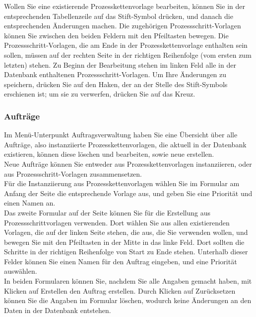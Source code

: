 \documentclass[enabledeprecatedfontcommands,fontsize=12pt,paper=a4,twoside]{scrartcl}
\begin{document}
Wollen Sie eine existierende Prozesskettenvorlage bearbeiten, können Sie in der entsprechenden Tabellenzeile auf das Stift-Symbol drücken, und danach die entsprechenden Änderungen machen. Die zugehörigen Prozessschritt-Vorlagen können Sie zwischen den beiden Feldern mit den Pfeiltasten bewegen. Die Prozessschritt-Vorlagen, die am Ende in der Prozesskettenvorlage enthalten sein sollen, müssen auf der rechten Seite in der richtigen Reihenfolge (vom ersten zum letzten) stehen. Zu Beginn der Bearbeitung stehen im linken Feld alle in der Datenbank enthaltenen Prozessschritt-Vorlagen. Um Ihre Änderungen zu speichern, drücken Sie auf den Haken, der an der Stelle des Stift-Symbols erschienen ist; um sie zu verwerfen, drücken Sie auf das Kreuz. \\

\subsubsection{Aufträge}

Im Menü-Unterpunkt Auftragsverwaltung haben Sie eine Übersicht über alle Aufträge, also instanziierte Prozesskettenvorlagen, die aktuell in der Datenbank existieren, können diese löschen und bearbeiten, sowie neue erstellen. \\

Neue Aufträge können Sie entweder aus Prozesskettenvorlagen instanziieren, oder aus Prozessschritt-Vorlagen zusammensetzen. \\

Für die Instanziierung aus Prozesskettenvorlagen wählen Sie im Formular am Anfang der Seite die entsprechende Vorlage aus, und geben Sie eine Priorität und einen Namen an. \\

Das zweite Formular auf der Seite können Sie für die Erstellung aus Prozessschrittvorlagen verwenden. Dort wählen Sie aus allen existierenden Vorlagen, die auf der linken Seite stehen, die aus, die Sie verwenden wollen, und bewegen Sie mit den Pfeiltasten in der Mitte in das linke Feld. Dort sollten die Schritte in der richtigen Reihenfolge von Start zu Ende stehen. Unterhalb dieser Felder können Sie einen Namen für den Auftrag eingeben, und eine Priorität auswählen. \\

In beiden Formularen können Sie, nachdem Sie alle Angaben gemacht haben, mit Klicken auf Erstellen den Auftrag erstellen. Durch Klicken auf Zurücksetzen können Sie die Angaben im Formular löschen, wodurch keine Änderungen an den Daten in der Datenbank entstehen. \\
\end{document}
